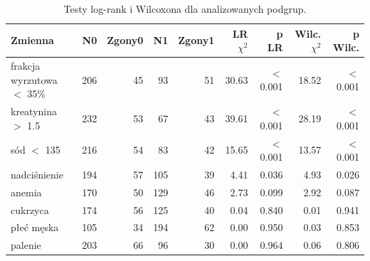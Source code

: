 \begin{table}[htbp]
\centering
\caption{Testy log-rank i Wilcoxona dla analizowanych podgrup.}
\label{tab:testy-nieparam}
\scriptsize
\setlength{\tabcolsep}{2.4pt}
\begin{tabular*}{.98\linewidth}{@{\extracolsep{\fill}}lrrrrrrrr}
\toprule
Zmienna & N0 & Zgony0 & N1 & Zgony1 & LR $\chi^2$ & p LR & Wilc. $\chi^2$ & p Wilc. \\
\midrule
frakcja wyrzutowa $<$ 35\% & 206 & 45 & 93 & 51 & 30.63 & $<$ 0.001 & 18.52 & $<$ 0.001 \\
kreatynina $>$ 1.5 & 232 & 53 & 67 & 43 & 39.61 & $<$ 0.001 & 28.19 & $<$ 0.001 \\
sód $<$ 135 & 216 & 54 & 83 & 42 & 15.65 & $<$ 0.001 & 13.57 & $<$ 0.001 \\
nadciśnienie & 194 & 57 & 105 & 39 & 4.41 & 0.036 & 4.93 & 0.026 \\
anemia & 170 & 50 & 129 & 46 & 2.73 & 0.099 & 2.92 & 0.087 \\
cukrzyca & 174 & 56 & 125 & 40 & 0.04 & 0.840 & 0.01 & 0.941 \\
płeć męska & 105 & 34 & 194 & 62 & 0.00 & 0.950 & 0.03 & 0.853 \\
palenie & 203 & 66 & 96 & 30 & 0.00 & 0.964 & 0.06 & 0.806 \\
\bottomrule
\end{tabular*}
\end{table}
